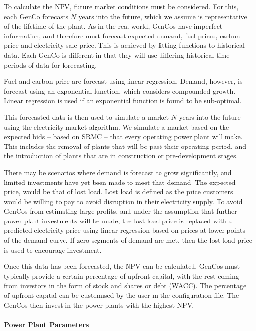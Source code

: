 To calculate the NPV, future market conditions must be considered. For this, each GenCo forecasts $N$ years into the future, which we assume is representative of the lifetime of the plant. As in the real world, GenCos have imperfect information, and therefore must forecast expected demand, fuel prices, carbon price and electricity sale price. This is achieved by fitting functions to historical data. Each GenCo is different in that they will use differing historical time periods of data for forecasting.

Fuel and carbon price are forecast using linear regression. Demand, however, is forecast using an exponential function, which considers compounded growth. Linear regression is used if an exponential function is found to be sub-optimal.

This forecasted data is then used to simulate a market $N$ years into the future using the electricity market algorithm. We simulate a market based on the expected bids -- based on SRMC -- that every operating power plant will make. This includes the removal of plants that will be past their operating period, and the introduction of plants that are in construction or pre-development stages. 

There may be scenarios where demand is forecast to grow significantly, and limited investments have yet been made to meet that demand. The expected price, would be that of lost load. Lost load is defined as the price customers would be willing to pay to avoid disruption in their electricity supply. To avoid GenCos from estimating large profits, and under the assumption that further power plant investments will be made, the lost load price is replaced with a predicted electricity price using linear regression based on prices at lower points of the demand curve. If zero segments of demand are met, then the  lost load price is used to encourage investment. 

Once this data has been forecasted\vphantom{Once expected fuel prices, carbon price, discount rate, and expected sale price of electricity are all forecast}, the NPV can be calculated. GenCos must typically provide a certain percentage of upfront capital, with the rest coming from investors in the form of stock and shares or debt (WACC). The percentage of upfront capital can be customised by the user in the configuration file. The GenCos then invest in the power plants with the highest NPV. 


\paragraph{Power Plant Parameters}\label{ssssec:powerplantparameters}

